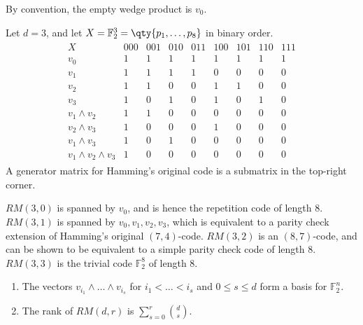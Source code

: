 By convention, the empty wedge product is $v_0$.

\begin{example}
    Let $d = 3$, and let $X = \mathbb F_2^3 = \qty{p_1, \dots, p_8}$ in binary order.
    \begin{align*}
        \begin{array}{c|cccccccc}
            X & 000 & 001 & 010 & 011 & 100 & 101 & 110 & 111 \\\hline
            v_0 & 1 & 1 & 1 & 1 & 1 & 1 & 1 & 1 \\
            v_1 & 1 & 1 & 1 & 1 & 0 & 0 & 0 & 0 \\
            v_2 & 1 & 1 & 0 & 0 & 1 & 1 & 0 & 0 \\
            v_3 & 1 & 0 & 1 & 0 & 1 & 0 & 1 & 0 \\
            v_1 \wedge v_2 & 1 & 1 & 0 & 0 & 0 & 0 & 0 & 0 \\
            v_2 \wedge v_3 & 1 & 0 & 0 & 0 & 1 & 0 & 0 & 0 \\
            v_1 \wedge v_3 & 1 & 0 & 1 & 0 & 0 & 0 & 0 & 0 \\
            v_1 \wedge v_2 \wedge v_3 & 1 & 0 & 0 & 0 & 0 & 0 & 0 & 0
        \end{array}
    \end{align*}
    A generator matrix for Hamming's original code is a submatrix in the top-right corner.
\end{example}

$RM(3,0)$ is spanned by $v_0$, and is hence the repetition code of length 8.
$RM(3,1)$ is spanned by $v_0, v_1, v_2, v_3$, which is equivalent to a parity check extension of Hamming's original $(7,4)$-code.
$RM(3,2)$ is an $(8,7)$-code, and can be shown to be equivalent to a simple parity check code of length 8.
$RM(3,3)$ is the trivial code $\mathbb F_2^8$ of length 8.

\begin{theorem}
    \begin{enumerate}
        \item The vectors $v_{i_1} \wedge \dots \wedge v_{i_s}$ for $i_1 < \dots < i_s$ and $0 \leq s \leq d$ form a basis for $\mathbb F_2^n$.
        \item The rank of $RM(d,r)$ is $\sum_{s=0}^r \binom{d}{s}$.
    \end{enumerate}
\end{theorem}

